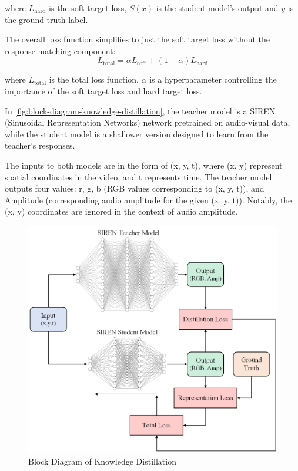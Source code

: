     where $L_{\text{hard}}$ is the soft target loss, $S(x)$ is the student model's output and $y$ is the ground truth label.

    The overall loss function simplifies to just the soft target loss without the response matching component:
    \begin{equation}
        L_{\text{total}} = \alpha L_{\text{soft}} + (1 - \alpha) L_{\text{hard}}
    \end{equation}

    where  $L_{\text{total}}$ is the total loss function, $\alpha$ is a hyperparameter controlling the importance of the soft target loss and hard target loss.
    
    In \autoref{fig:block-diagram-knowledge-distillation}, the teacher model is a SIREN (Sinusoidal Representation Networks) network pretrained on audio-visual data, while the student model is a shallower version designed to learn from the teacher's responses.
    
    The inputs to both models are in the form of (x, y, t), where (x, y) represent spatial coordinates in the video, and t represents time. The teacher model outputs four values: r, g, b (RGB values corresponding to (x, y, t)), and Amplitude (corresponding audio amplitude for the given (x, y, t)). Notably, the (x, y) coordinates are ignored in the context of audio amplitude.
    
    \begin{figure}[H]
        \centering
        \includegraphics[width=0.95\linewidth]{assets/Knowledge Distillation.png}
        \caption{Block Diagram of Knowledge Distillation}
        \label{fig:block-diagram-knowledge-distillation}
    \end{figure}

